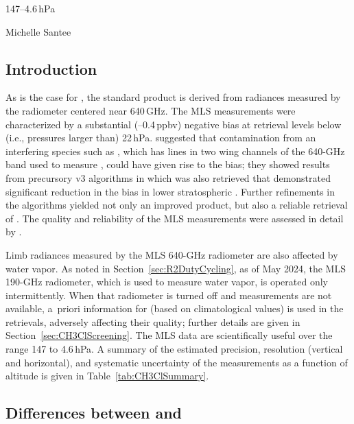 %
{\item[Useful range:] 147--4.6\,hPa
  \item[Product lead:] Michelle Santee }

\subsection{Introduction}

As is the case for , the standard  product is derived from radiances measured by the radiometer centered near 640\,GHz. The \vii MLS  measurements were characterized by a substantial (--0.4\,ppbv) negative bias at retrieval levels below (i.e., pressures larger than) 22\,hPa. \citet{SanteeEtal:2008:ClO} suggested that contamination from an interfering species such as , which has lines in two wing channels of the \mbox{640\nobreakdash-GHz} band used to measure , could have given rise to the bias; they showed results from precursory v3 algorithms in which  was also retrieved that demonstrated significant reduction in the bias in lower stratospheric \@. Further refinements in the \viii algorithms yielded not only an improved  product, but also a reliable retrieval of . The quality and reliability of the \viii MLS  measurements were assessed in detail by \citet{SanteeEtal:2013}.

Limb radiances measured by the MLS \mbox{640-GHz} radiometer are also affected by water vapor. As noted in Section~\ref{sec:R2DutyCycling}, as of May 2024, the MLS \mbox{190-GHz} radiometer, which is used to measure water vapor, is operated only intermittently. When that radiometer is turned off and  measurements are not available, a~priori information for  (based on climatological values) is used in the  retrievals, adversely affecting their quality; further details are given in Section~\ref{sec:CH3ClScreening}. The MLS \thisv {} data are scientifically useful over the range 147 to 4.6\,hPa. A summary of the estimated precision, resolution (vertical and horizontal), and systematic uncertainty of the \thisv {} measurements as a function of altitude is given in Table~\ref{tab:CH3ClSummary}.

\subsection{Differences between \prevv and \thisv}

